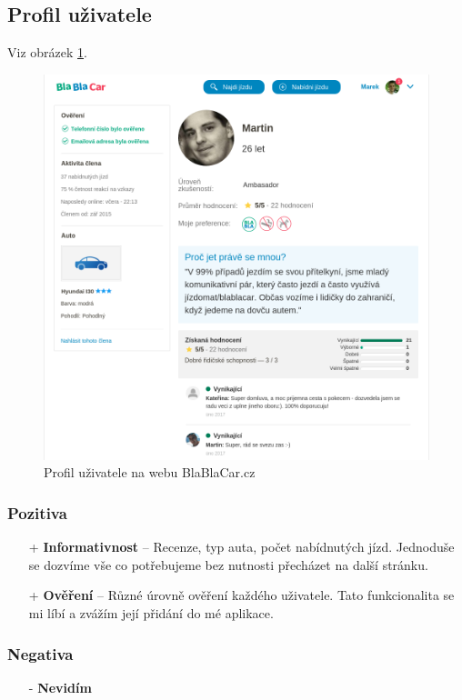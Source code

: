
\newpage
\subsection{Profil uživatele}
Viz obrázek \ref{fig:blablacar:profile}.
\begin{figure}[h]
    \centering
    \includegraphics[width=1.0\textwidth]{media/blablacar/profile.png}
    \caption{Profil uživatele na webu BlaBlaCar.cz}
    \label{fig:blablacar:profile}
\end{figure}
\subsubsection*{Pozitiva}
\begin{itemize}
    \item[+] \textbf{Informativnost} -- Recenze, typ auta, počet nabídnutých jízd. Jednoduše se dozvíme vše co potřebujeme bez nutnosti přecházet na další stránku.
    \item[+] \textbf{Ověření} -- Různé úrovně ověření každého uživatele. Tato funkcionalita se mi líbí a zvážím její přidání do mé aplikace.
\end{itemize}
\subsubsection*{Negativa}
\begin{itemize}
    \item[-] \textbf{Nevidím}
\end{itemize}


